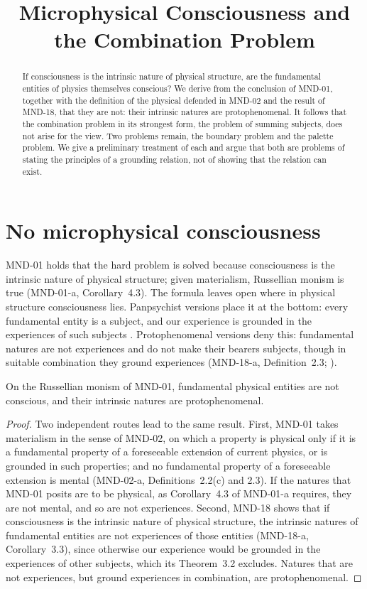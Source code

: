 \documentclass{situationist-preprint}
\title{Microphysical Consciousness and the Combination Problem}
\begin{document}
\maketitle

\begin{abstract}
If consciousness is the intrinsic nature of physical structure, are the fundamental entities of physics themselves conscious? We derive from the conclusion of MND-01, together with the definition of the physical defended in MND-02 and the result of MND-18, that they are not: their intrinsic natures are protophenomenal. It follows that the combination problem in its strongest form, the problem of summing subjects, does not arise for the view. Two problems remain, the boundary problem and the palette problem. We give a preliminary treatment of each and argue that both are problems of stating the principles of a grounding relation, not of showing that the relation can exist.
\end{abstract}

\section{No microphysical consciousness}\label{s:micro}

MND-01 holds that the hard problem is solved because consciousness is the intrinsic nature of physical structure; given materialism, Russellian monism is true (MND-01-a, Corollary~4.3). The formula leaves open where in physical structure consciousness lies. Panpsychist versions place it at the bottom: every fundamental entity is a subject, and our experience is grounded in the experiences of such subjects \citep{Strawson2006,Goff2017}. Protophenomenal versions deny this: fundamental natures are not experiences and do not make their bearers subjects, though in suitable combination they ground experiences (MND-18-a, Definition~2.3; \citealp{Chalmers2013}).

\begin{proposition}\label{p:nomicro}
On the Russellian monism of MND-01, fundamental physical entities are not conscious, and their intrinsic natures are protophenomenal.
\end{proposition}

\begin{proof}
Two independent routes lead to the same result. First, MND-01 takes materialism in the sense of MND-02, on which a property is physical only if it is a fundamental property of a foreseeable extension of current physics, or is grounded in such properties; and no fundamental property of a foreseeable extension is mental (MND-02-a, Definitions~2.2(c) and 2.3). If the natures that MND-01 posits are to be physical, as Corollary~4.3 of MND-01-a requires, they are not mental, and so are not experiences. Second, MND-18 shows that if consciousness is the intrinsic nature of physical structure, the intrinsic natures of fundamental entities are not experiences of those entities (MND-18-a, Corollary~3.3), since otherwise our experience would be grounded in the experiences of other subjects, which its Theorem~3.2 excludes. Natures that are not experiences, but ground experiences in combination, are protophenomenal.
\end{proof}
\end{document}
